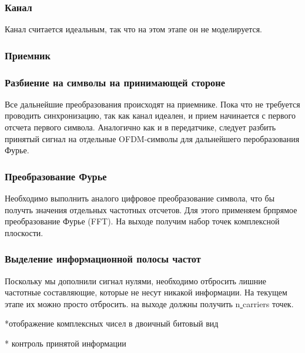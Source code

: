 \documentclass[a4paper,12pt]{article}
\begin{document}
\subsubsection{Канал}

Канал считается идеальным, так что на этом этапе он не моделируется. 


\subsubsection{Приемник}

 \subsubsection*{Разбиение на символы на принимающей стороне}
 Все дальнейшие преобразования происходят на приемнике.
 Пока что не требуется проводить синхронизацию, так как канал идеален, и прием начинается с первого отсчета первого символа. 
 Аналогично как и в передатчике, следует разбить принятый сигнал на отдельные OFDM-символы для дальнейшего перобразования Фурье. 
 
 
\subsubsection*{Преобразование Фурье}
Необходимо выполнить аналого цифровое преобразование символа,  что бы получть значения отдельных частотных отсчетов.
Для этого применяем брпрямое преобразование Фурье (FFT).
На выходе получим набор точек комплексной плоскости.

\subsubsection*{Выделение информационной полосы частот}
Поскольку мы дополнили сигнал нулями, необходимо отбросить лишние частотные составляющие, которые не несут никакой информации. 
На текущем этапе их можно просто отбросить.
на выходе должны получить  n\underline{ }carriers точек.  


*отображение комплексных чисел в двоичный битовый вид

* контроль принятой информации
\end{document}

